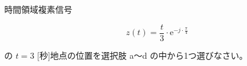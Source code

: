 時間領域複素信号 

\[
z(t) = \frac{t}{3} \cdot \textrm{e}^{ -j \cdot \frac{\pi}{4} }
\]

\medskip
\noindent の $t = 3$ [秒]地点の位置を選択肢 a〜d の中から1つ選びなさい。
